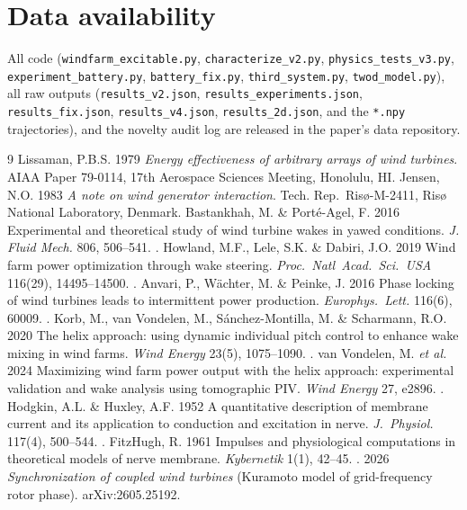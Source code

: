 \documentclass[11pt]{article}
\begin{document}
\section*{Data availability}

All code (\texttt{windfarm\_excitable.py}, \texttt{characterize\_v2.py},
\texttt{physics\_tests\_v3.py}, \texttt{experiment\_battery.py},
\texttt{battery\_fix.py}, \texttt{third\_system.py}, \texttt{twod\_model.py}), all raw outputs
(\texttt{results\_v2.json}, \texttt{results\_experiments.json}, \texttt{results\_fix.json},
\texttt{results\_v4.json}, \texttt{results\_2d.json}, and the \texttt{*.npy} trajectories), and the novelty audit log
are released in the paper's data repository.

\begin{thebibliography}{9}
 Lissaman, P.B.S. 1979 \emph{Energy effectiveness of arbitrary arrays of wind turbines}. AIAA Paper 79-0114, 17th Aerospace Sciences Meeting, Honolulu, HI.
 Jensen, N.O. 1983 \emph{A note on wind generator interaction}. Tech. Rep.\ Ris\o{}-M-2411, Ris\o{} National Laboratory, Denmark.
 Bastankhah, M. \& Port\'e-Agel, F. 2016 Experimental and theoretical study of wind turbine wakes in yawed conditions. \emph{J. Fluid Mech.} 806, 506--541. .
 Howland, M.F., Lele, S.K. \& Dabiri, J.O. 2019 Wind farm power optimization through wake steering. \emph{Proc.\ Natl\ Acad.\ Sci.\ USA} 116(29), 14495--14500. .
 Anvari, P., W\"achter, M. \& Peinke, J. 2016 Phase locking of wind turbines leads to intermittent power production. \emph{Europhys.\ Lett.} 116(6), 60009. .
 Korb, M., van Vondelen, M., S\'anchez-Montilla, M. \& Scharmann, R.O. 2020 The helix approach: using dynamic individual pitch control to enhance wake mixing in wind farms. \emph{Wind Energy} 23(5), 1075--1090. .
 van Vondelen, M. \emph{et al.} 2024 Maximizing wind farm power output with the helix approach: experimental validation and wake analysis using tomographic PIV. \emph{Wind Energy} 27, e2896. .
 Hodgkin, A.L. \& Huxley, A.F. 1952 A quantitative description of membrane current and its application to conduction and excitation in nerve. \emph{J.\ Physiol.} 117(4), 500--544. .
 FitzHugh, R. 1961 Impulses and physiological computations in theoretical models of nerve membrane. \emph{Kybernetik} 1(1), 42--45. .
 2026 \emph{Synchronization of coupled wind turbines} (Kuramoto model of grid-frequency rotor phase). arXiv:2605.25192.
\end{thebibliography}
\end{document}
